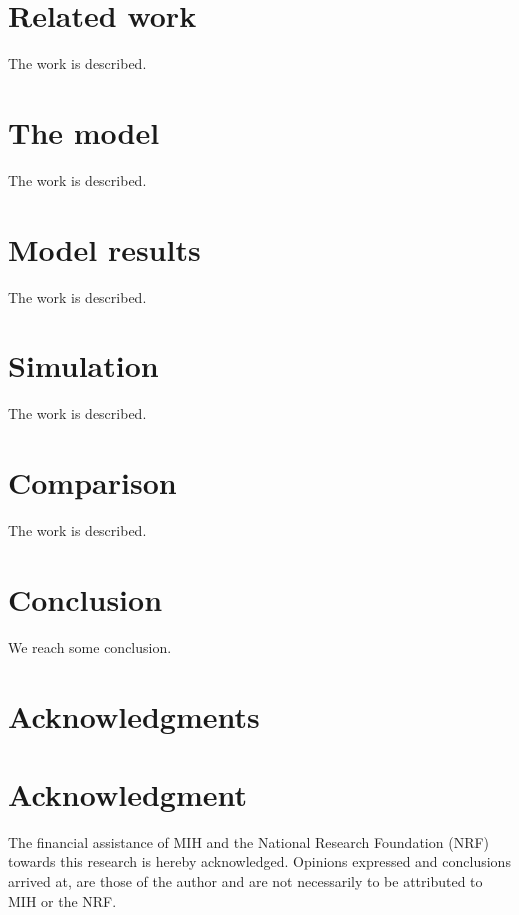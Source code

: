 \documentclass[10pt,a4paper,conference]{IEEEtran}
\begin{document}
\section{Related work}
\label{related_work}

The work is described.

\section{The model}
\label{model}

The work is described.

\section{Model results}
\label{results}

The work is described.

\section{Simulation}
\label{simulation}

The work is described.


\section{Comparison}
\label{comparison}

The work is described.

\section{Conclusion}
\label{conclusion}

We reach some conclusion.

\ifCLASSOPTIONcompsoc
  \section*{Acknowledgments}
\else
  \section*{Acknowledgment}
\fi

The financial assistance of MIH and the National Research Foundation (NRF) towards this research is hereby acknowledged. Opinions expressed and
conclusions arrived at, are those of the author and are not necessarily to be attributed to MIH or the NRF.




\end{document}
